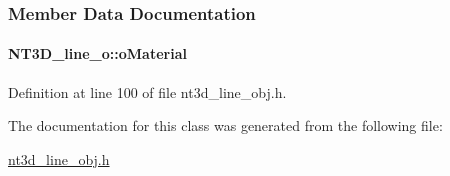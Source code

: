 \subsubsection{Member Data Documentation}
\paragraph[{oMaterial}]{ {\bf NT3D\_\-line\_\-o::oMaterial}}\hfill\label{class_n_t3_d__line__o_ada44ee217cae13e7bad1bfa8f5835493}


Definition at line 100 of file nt3d\_\-line\_\-obj.h.



The documentation for this class was generated from the following file:\begin{DoxyCompactItemize}
\item 
\hyperlink{nt3d__line__obj_8h}{nt3d\_\-line\_\-obj.h}\end{DoxyCompactItemize}
